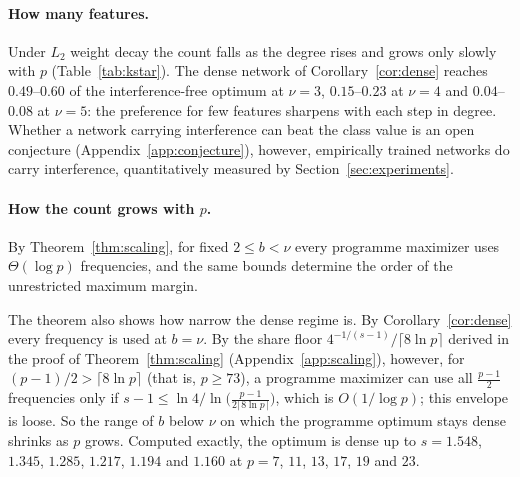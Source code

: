 \paragraph{How many features.} Under $L_2$ weight decay the count falls as the degree rises and grows only slowly with $p$ (Table~\ref{tab:kstar}). The dense network of Corollary~\ref{cor:dense} reaches $0.49$--$0.60$ of the interference-free optimum at $\nu=3$, $0.15$--$0.23$ at $\nu=4$ and $0.04$--$0.08$ at $\nu=5$: the preference for few features sharpens with each step in degree. Whether a network carrying interference can beat the class value is an open conjecture (Appendix~\ref{app:conjecture}), however, empirically trained networks do carry interference, quantitatively measured by  Section~\ref{sec:experiments}.

\paragraph{How the count grows with $p$.}
By Theorem~\ref{thm:scaling}, for fixed $2\le b<\nu$ every programme maximizer uses $\Theta(\log p)$ frequencies, and the same bounds determine the order of the unrestricted maximum margin. 

The theorem also shows how narrow the dense regime is. By Corollary~\ref{cor:dense} every frequency is used at $b=\nu$. By the share floor $4^{-1/(s-1)}/\lceil8\ln p\rceil$ derived in the proof of Theorem~\ref{thm:scaling} (Appendix~\ref{app:scaling}), however, for $(p-1)/2>\lceil8\ln p\rceil$ (that is, $p\ge73$), a programme maximizer can use all $\frac{p-1}2$ frequencies only if $s-1\le\ln4/\ln\big(\frac{p-1}{2\lceil8\ln p\rceil}\big)$, which is $O(1/\log p)$; this envelope is loose. So the range of $b$ below $\nu$ on which the programme optimum stays dense shrinks as $p$ grows. Computed exactly, the optimum is dense up to $s=1.548$, $1.345$, $1.285$, $1.217$, $1.194$ and $1.160$ at $p=7$, $11$, $13$, $17$, $19$ and $23$.
